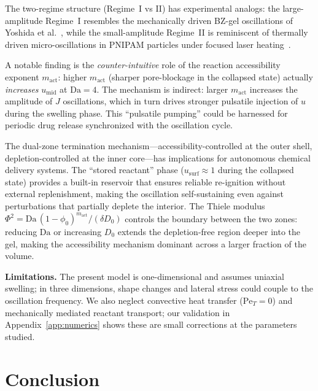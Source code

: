 \documentclass[aps,pre,reprint,superscriptaddress,longbibliography,floatfix]{revtex4-2}
\newcommand{\Da}{\mathrm{Da}}
\begin{document}
The two-regime structure (Regime~I vs II) has experimental analogs: the
large-amplitude Regime~I resembles the mechanically driven BZ-gel
oscillations of Yoshida et al.~\cite{Yoshida2010}, while the
small-amplitude Regime~II is reminiscent of thermally driven
micro-oscillations in PNIPAM particles under focused laser
heating~\cite{Karg2008}.

A notable finding is the \emph{counter-intuitive} role of the reaction
accessibility exponent $m_\mathrm{act}$: higher $m_\mathrm{act}$ (sharper
pore-blockage in the collapsed state) actually \emph{increases}
$u_\mathrm{mid}$ at $\Da=4$. The mechanism is indirect: larger
$m_\mathrm{act}$ increases the amplitude of $J$ oscillations, which
in turn drives stronger pulsatile injection of $u$ during the swelling
phase. This ``pulsatile pumping'' could be harnessed for periodic drug
release synchronized with the oscillation cycle.

The dual-zone termination mechanism---accessibility-controlled at the outer
shell, depletion-controlled at the inner core---has implications for
autonomous chemical delivery systems. The ``stored reactant'' phase
($u_\mathrm{surf}\approx 1$ during the collapsed state) provides a
built-in reservoir that ensures reliable re-ignition without external
replenishment, making the oscillation self-sustaining even against
perturbations that partially deplete the interior. The Thiele modulus
$\Phi^2 = \Da\,(1-\phi_0)^{m_\mathrm{act}}/(\delta D_0)$ controls the
boundary between the two zones: reducing $\Da$ or increasing $D_0$
extends the depletion-free region deeper into the gel, making the
accessibility mechanism dominant across a larger fraction of the volume.

\textbf{Limitations.} The present model is one-dimensional and assumes
uniaxial swelling; in three dimensions, shape changes and lateral stress
could couple to the oscillation frequency. We also neglect convective
heat transfer ($\mathrm{Pe}_T = 0$) and mechanically mediated reactant
transport; our validation in Appendix~\ref{app:numerics} shows these
are small corrections at the parameters studied.

\section{Conclusion}
\label{sec:conclusion}
\end{document}
